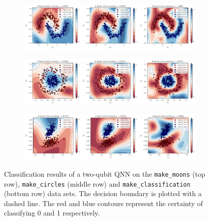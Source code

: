 \documentclass[a4paper,10pt]{article}
\begin{document}
\begin{appendices}
\begin{figure}[ht]
	\centering
	\begin{subfigure}{1\textwidth}
		\centering
		\includegraphics[width=1\linewidth]{figures/qnn_moons_classification.pdf}
	\end{subfigure}
	\begin{subfigure}{1\textwidth}
		\centering
		\includegraphics[width=1\linewidth]{figures/qnn_circles_classification.pdf}
	\end{subfigure}
	\begin{subfigure}{1\textwidth}
		\centering
		\includegraphics[width=1\linewidth]{figures/qnn_linear_classification.pdf}
	\end{subfigure}
	\cprotect\caption{Classification results of a two-qubit QNN on the \verb|make_moons| (top row), \verb|make_circles| (middle row) and \verb|make_classification| (bottom row) data sets. The decision boundary is plotted with a dashed line. The red and blue contours represent the certainty of classifying 0 and 1 respectively.}
	\label{fig:classification_decision_regions}
\end{figure}
\end{appendices}
\end{document}
